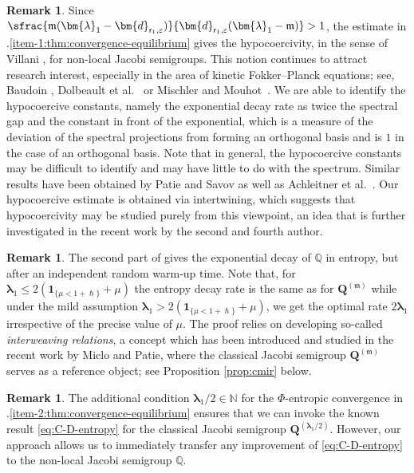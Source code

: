 \documentclass[JEP,XML,SOM,Unicode]{cedram}
\let\epsilon\varepsilon
\theoremstyle{plain}
\theoremstyle{definition}
\newtheorem{remark}[theorem]{Remark}
\newcommand{\N}{\mathbb{N}}
\newcommand{\J}{\mathds{Q}}
\newcommand{\m}{\mathfrak{m}}
\newcommand{\dpt}{\bm{d}_{\vat,\epsilon}}
\newcommand{\lam}{{\bm{\lambda}_1}}
\newcommand{\vat}{{\mathsf{r}_1}}
\newcommand{\Q}[1][\mo]{\mathbf{Q}^{({#1})}}
\let\h\hslash
\let\mo\mu
\begin{document}
\begin{remark}
Since $\sfrac{\m(\lam-\dpt)}{\dpt(\lam-\m)} > 1$, the estimate in .\eqref{item-1:thm:convergence-equilibrium} gives the hypocoercivity, in the sense of Villani \cite{Villani-09}, for non-local Jacobi semigroups. This notion continues to attract research interest, especially in the area of kinetic Fokker--Planck equations; see, \eg Baudoin \cite{Baudoin}, Dolbeault et al.~\cite{Mouhot} or Mischler and Mouhot~\cite{Mischler2016}. We are able to identify the hypocoercive constants, namely the exponential decay rate as twice the spectral gap and the constant in front of the exponential, which is a measure of the deviation of the spectral projections from forming an orthogonal basis and is $1$ in the case of an orthogonal basis. Note that in general, the hypocoercive constants may be difficult to identify and may have little to do with the spectrum. Similar results have been obtained by Patie and Savov \cite{Patie-Savov-GeL} as well as Achleitner et al.~\cite{BGK}. Our hypocoercive estimate is obtained via intertwining, which suggests that hypocoercivity may be studied purely from this viewpoint, an idea that is further investigated in the recent work \cite{PV-Hypo} by the second and fourth author.
\end{remark}

\begin{remark}
The second part of  gives the exponential decay of $\J$ in entropy, but after an independent random warm-up time. Note that, for $\lam \leq 2(\bm{1}_{\{\mo < 1+\h \}} + \mo)$ the entropy decay rate is the same as for $\Q[\m]$ while under the mild assumption $\lam > 2(\bm{1}_{\{\mo < 1+\h \}} + \mo)$, we get the optimal rate $2 \lam$
irrespective of the precise value of $\mo$. The proof relies on developing so-called \emph{interweaving relations}, a concept which has been introduced and studied in the recent work \cite{Patie-Miclo} by Miclo and Patie, where the classical Jacobi semigroup $\Q[\m]$ serves as a reference object; see Proposition \ref{prop:cmir} below.
\end{remark}

\begin{remark}
The additional condition $\lam/2 \in \N$ for the $\Phi$-entropic convergence in .\eqref{item-2:thm:convergence-equilibrium} ensures that we can invoke the known result \eqref{eq:C-D-entropy} for the classical Jacobi semigroup $\Q[\lam/2]$. However, our approach allows us to immediately transfer any improvement of \eqref{eq:C-D-entropy} to the non-local Jacobi semigroup $\J$.
\end{remark}
\end{document}
